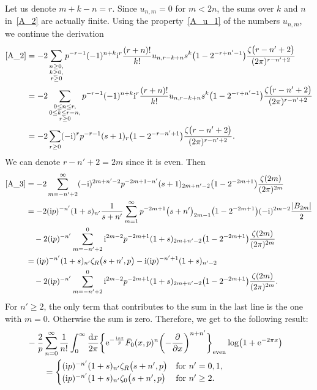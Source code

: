 \documentclass[pdftex]{sigma}
\numberwithin{equation}{section}
\begin{document}
Let us denote $m+k-n=r$. Since $u_{n, m}=0$ for $m<2n$, the sums over $k$ and $n$ in~\eqref{A_2} are actually finite. Using the property~\eqref{A_u_1} of the numbers $u_{n, m}$, we continue the derivation
\begin{align}
\eqref{A_2}&{}=-2\sum_{\substack{n \geq 0,\\ k \geq 0,\\ r \geq 0}} p^{-r-1} (-1)^{n+k} {\rm i}^{r} \frac{(r+n)!}{k!} u_{n, r-k+n} s^k \bigl(1-2^{-r+n'-1}\bigr) \frac{\zeta\bigl(r-n'+2\bigr)}{(2\pi)^{r-n'+2}}\nonumber\\
           &{}=-2\sum_{\substack{0 \leq n \leq r,\\ 0 \leq k \leq r-n, \\ r \geq 0}} p^{-r-1} (-1)^{n+k} {\rm i}^{r} \frac{(r+n)!}{k!} u_{n, r-k+n} s^k \bigl(1-2^{-r+n'-1}\bigr) \frac{\zeta\bigl(r-n'+2\bigr)}{(2\pi)^{r-n'+2}}\cr
           &{}=-2\sum_{r \geq 0} (-{\rm i})^{r} p^{-r-1} (s+1)_r \bigl(1-2^{-r-n'+1}\bigr)\frac{\zeta\bigl(r-n'+2\bigr)}{(2\pi)^{r-n'+2}}.\label{A_3}
\end{align}
We can denote $r-n'+2=2m$ since it is even. Then
\begin{align*}
\eqref{A_3}&=-2\sum_{m=-n'+2}^{\infty} (-{\rm i})^{2m+n'-2} p^{-2m+1-n'} (s+1)_{2m+n'-2} \bigl(1-2^{-2m+1}\bigr)\frac{\zeta(2m)}{(2\pi)^{2m}}\\
                     &=-2({\rm i}p)^{-n'}(1+s)_{n'}\frac{1}{s+n'}\sum_{m=1}^{\infty} p^{-2m+1} \bigl(s+n'\bigr)_{2m-1} \bigl(1-2^{-2m+1}\bigr) (-{\rm i})^{2m-2} \frac{|B_{2m}|}{2}\cr
                     &\quad{} -2({\rm i}p)^{-n'} \sum_{m=-n'+2}^{0} {\rm i}^{2m-2} p^{-2m+1} (1+s)_{2m+n'-2} \bigl(1-2^{-2m+1}\bigr)\frac{\zeta(2m)}{(2\pi)^{2m}} \cr
                     &=({\rm i}p)^{-n'} (1+s)_{n'} \zeta_{R}\bigl(s+n', p\bigr)-{\rm i}({\rm i}p)^{-n'+1}(1+s)_{n'-2}\cr
                     &\quad{} -2({\rm i}p)^{-n'} \sum_{m=-n'+2}^{0} {\rm i}^{2m-2} p^{-2m+1} (1+s)_{2m+n'-2} \bigl(1-2^{-2m+1}\bigr)\frac{\zeta(2m)}{(2\pi)^{2m}} .\nonumber
\end{align*}
For $n'\geq2$, the only term that contributes to the sum in the last line is the one with $m=0$. Otherwise the sum is zero. Therefore, we get to the following result:
\begin{align}
&-\frac{2}{p} \sum_{n=0}^{\infty} \frac{1}{n!} \int_{0}^{\infty} \frac{{\rm d}x}{2\pi} \biggl\{ {\rm e}^{-\frac{{\rm i}sx}{p}} \bar{F}_0(x, p)^n \biggl(-\frac{\partial}{\partial x}\biggr)^{n+n'} \biggr\}_{\text{even}} \log\bigl(1+{\rm e}^{-2\pi x}\bigr) \cr
&\qquad =
\begin{cases}
({\rm i}p)^{-n'} (1+s)_{n'} \zeta_{R}\bigl(s+n', p\bigr) & \text{for } n'=0, 1, \\
({\rm i}p)^{-n'} (1+s)_{n'} \zeta_{0}\bigl(s+n', p\bigr) & \text{for } n'\geq 2.
\end{cases}\label{A_Integral_Answer}
\end{align}
\end{document}
